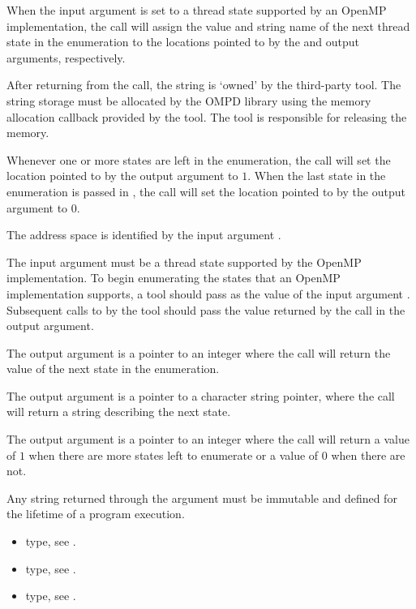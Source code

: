 \begin{itemize}
When the  input argument is set to a 
thread state supported by an OpenMP implementation,
the call will assign the value and string name of the next thread state in the enumeration
to the locations pointed to by the 
 and  output arguments, respectively.

After returning from the call, the string  is `owned' by the 
third-party tool.
The string storage must be allocated by the OMPD library using the memory allocation 
callback provided by the tool.
The tool is responsible for releasing the memory.

Whenever one or more states are left in the enumeration,
the call will set the location pointed to by the  
output argument to $1$.
When the last state in the enumeration is passed in , 
the call will set the location pointed to by the  output
argument to $0$.


\argdesc

The address space is identified by the input argument .

The input argument  must be a thread state
supported by the OpenMP implementation.  To begin enumerating the
states that an OpenMP implementation supports, a tool should pass
 as the value of the input argument .  Subsequent
calls to  by the tool should pass the
value returned by the call in the  output argument.

The output argument  is a pointer to an integer where
the call will return the value of the next state in the
enumeration.

The output argument  is a pointer to a
character string pointer, where the call will return a string
describing the next state.

The output argument  is a pointer to an integer where
the call will return a value of $1$ when there are more states left to enumerate
or a value of $0$ when there are not.

\constraints
Any string returned through the argument
 must be immutable and defined
for the lifetime of a program execution.

\crossreferences
\begin{itemize}
\item {} type, see .
\item {} type, see .
\item {} type, see .
\end{itemize}


\end{itemize}
